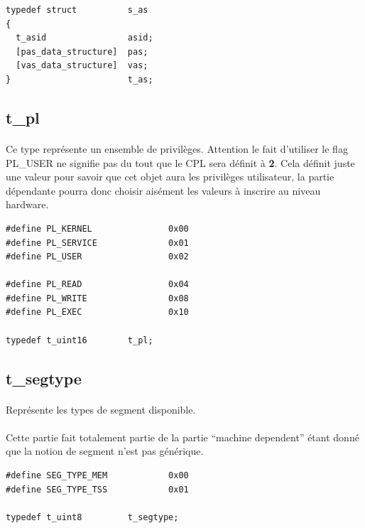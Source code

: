 \documentclass[10pt,a4wide]{article}
\begin{document}
\begin{verbatim}
typedef struct          s_as
{
  t_asid                asid;
  [pas_data_structure]  pas;
  [vas_data_structure]  vas;
}                       t_as;
\end{verbatim}

\subsection{t\_pl}

\paragraph{}

Ce type repr\'esente un ensemble de privil\`eges. Attention le fait
d'utiliser le flag PL\_USER ne signifie pas du tout que le CPL sera
d\'efinit \`a \textbf{2}. Cela d\'efinit juste une valeur pour savoir
que cet objet aura les privil\`eges utilisateur, la partie d\'ependante
pourra donc choisir ais\'ement les valeurs \`a inscrire au niveau hardware.

\begin{verbatim}
#define PL_KERNEL               0x00
#define PL_SERVICE              0x01
#define PL_USER                 0x02

#define PL_READ                 0x04
#define PL_WRITE                0x08
#define PL_EXEC                 0x10

typedef t_uint16        t_pl;
\end{verbatim}

\subsection{t\_segtype}

\paragraph{}

Repr\'esente les types de segment disponible.

\paragraph{}

Cette partie fait totalement partie de la partie ``machine dependent''
\'etant donn\'e que la notion de segment n'est pas g\'en\'erique.

\begin{verbatim}
#define SEG_TYPE_MEM            0x00
#define SEG_TYPE_TSS            0x01

typedef t_uint8         t_segtype;
\end{verbatim}
\end{document}
